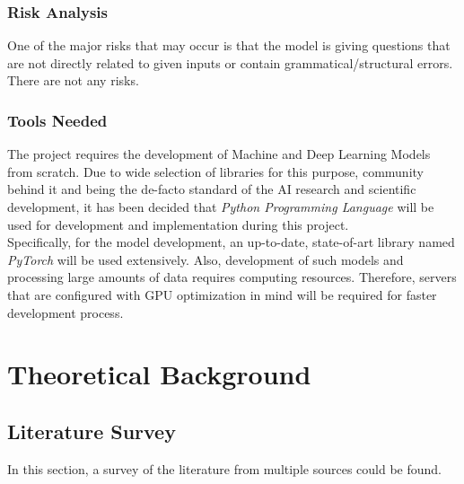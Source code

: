 \documentclass{mefsdp}
\begin{document}
	\subsubsection{Risk Analysis}
	One of the major risks that may occur is that the model is giving questions that are not directly related to given inputs or contain grammatical/structural errors. There are not any risks.
	
	\subsubsection{Tools Needed}
	The project requires the development of Machine and Deep Learning Models from scratch. Due to wide selection of libraries for this purpose, community behind it and being the de-facto standard of the AI research and scientific development, it has been decided that \textit{Python Programming Language} will be used for development and implementation during this project.\\
	
	Specifically, for the model development, an up-to-date, state-of-art library named \textit{PyTorch} will be used extensively. Also, development of such models and processing large amounts of data requires computing resources. Therefore, servers that are configured with GPU optimization in mind will be required for faster development process.
	
	
	
	\section{Theoretical Background}
	\subsection{Literature Survey}
	In this section, a survey of the literature from multiple sources could be found.
\end{document}
